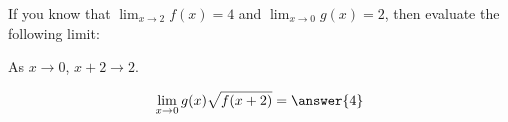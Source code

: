 \documentclass{ximera}
\author{Steven Gubkin}
\begin{document}
\begin{exercise}

	If you know that $\lim_{x \to 2} f(x) = 4$ and $\lim_{x \to 0} g(x) = 2$, then evaluate the following limit:
	
	\begin{hint}
		 As $x\to 0$, $x+2 \to 2$.
	\end{hint}
	\[
		\lim_{x \to 0} g(x)\sqrt{f(x+2)} = \answer{4}
	\]
	
\end{exercise}
\end{document}
